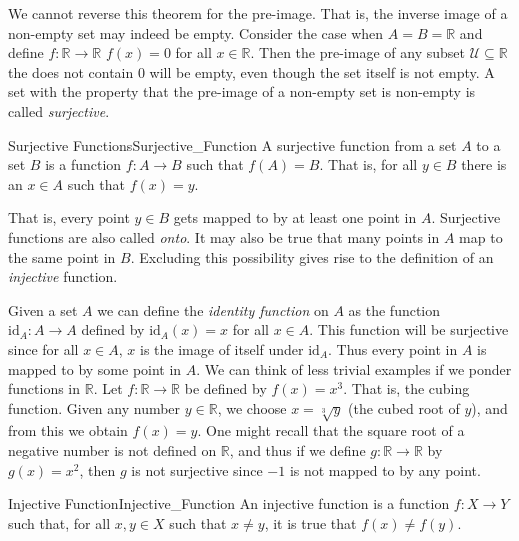     We cannot reverse this theorem for the pre-image. That is, the inverse image
    of a non-empty set may indeed be empty. Consider the case when
    $A=B=\mathbb{R}$ and define $f:\mathbb{R}\rightarrow\mathbb{R}$
    $f(x)=0$ for all $x\in\mathbb{R}$. Then the pre-image of any subset
    $\mathcal{U}\subseteq\mathbb{R}$ the does not contain 0 will be empty, even
    though the set itself is not empty. A set with the property that the
    pre-image of a non-empty set is non-empty is called \textit{surjective}.
    \begin{fdefinition}{Surjective Functions}{Surjective_Function}
        A \gls{surjective function} from a \gls{set} $A$ to a set $B$ is a
        \gls{function} $f:A\rightarrow{B}$ such that $f(A)=B$. That is, for all
        $y\in{B}$ there is an $x\in{A}$ such that $f(x)=y$.
    \end{fdefinition}
    That is, every point $y\in{B}$ gets mapped to by at least one point in $A$.
    Surjective functions are also called \textit{onto}. It may also be true that
    many points in $A$ map to the same point in $B$. Excluding this possibility
    gives rise to the definition of an \textit{injective} function.
    \begin{example}
        Given a set $A$ we can define the \textit{identity function} on $A$ as
        the function $\textrm{id}_{A}:A\rightarrow{A}$ defined by
        $\textrm{id}_{A}(x)=x$ for all $x\in{A}$. This function will be
        surjective since for all $x\in{A}$, $x$ is the image of itself under
        $\textrm{id}_{A}$. Thus every point in $A$ is mapped to by some point
        in $A$. We can think of less trivial examples if we ponder functions in
        $\mathbb{R}$. Let $f:\mathbb{R}\rightarrow\mathbb{R}$ be defined by
        $f(x)=x^{3}$. That is, the cubing function. Given any number
        $y\in\mathbb{R}$, we choose $x=\sqrt[3]{y}$ (the cubed root of $y$),
        and from this we obtain $f(x)=y$. One might recall that the square root
        of a negative number is not defined on $\mathbb{R}$, and thus if we
        define $g:\mathbb{R}\rightarrow\mathbb{R}$ by $g(x)=x^{2}$, then $g$ is
        not surjective since $\minus{1}$ is not mapped to by any point.
    \end{example}    
    \begin{fdefinition}{Injective Function}{Injective_Function}
        An \gls{injective function} is a function
        $f:X\rightarrow{Y}$ such that, for all
        $x,y\in{X}$ such that $x\ne{y}$, it is true that
        $f(x)\ne{f}(y)$.
    \end{fdefinition}
